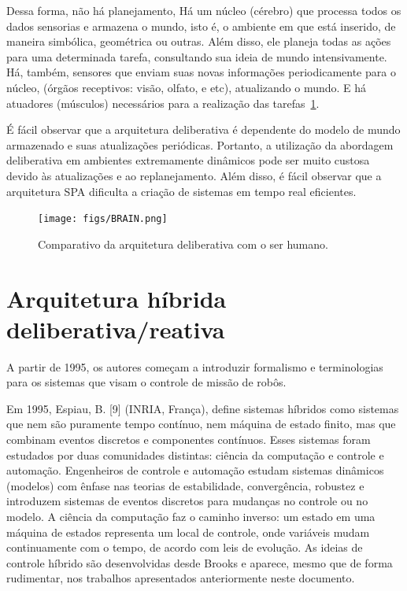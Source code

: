 Dessa forma, não há planejamento,  Há um núcleo (cérebro) que processa todos os
dados sensorias e armazena o mundo, isto é, o ambiente em que está inserido, de maneira simbólica, geométrica ou outras.
Além disso, ele planeja todas as ações para uma determinada tarefa, consultando sua ideia de mundo intensivamente. Há,
também, sensores que enviam suas novas informações periodicamente para o núcleo,
(órgãos receptivos: visão, olfato, e etc), atualizando o mundo. E há
atuadores (músculos) necessários para a realização das tarefas~\ref{brain}.

É fácil observar que a arquitetura deliberativa é dependente do
modelo de mundo armazenado e suas atualizações periódicas. Portanto, a
utilização da abordagem deliberativa em ambientes extremamente dinâmicos pode ser muito
custosa devido às atualizações e ao replanejamento. Além disso, é fácil observar
que a arquitetura SPA dificulta a criação de sistemas em tempo real eficientes.

\begin{figure}[H]
\centering
\texttt{[image: figs/BRAIN.png]}
\caption{Comparativo da arquitetura deliberativa com o ser humano.}
\label{brain}
\end{figure}


\section{Arquitetura híbrida deliberativa/reativa}



A partir de 1995, os autores começam a introduzir formalismo e terminologias
para os sistemas que visam o controle de missão de robôs. 

Em 1995, Espiau, B. [9] (INRIA, França), define sistemas híbridos como sistemas
que nem são puramente tempo contínuo, nem máquina de estado finito, mas que
combinam eventos discretos e componentes contínuos. Esses sistemas foram
estudados por duas comunidades distintas: ciência da computação e controle e
automação. Engenheiros de controle e automação estudam sistemas dinâmicos
(modelos) com ênfase nas teorias de estabilidade, convergência, robustez e
introduzem sistemas de eventos discretos para mudanças no controle ou no modelo.
A ciência da computação faz o caminho inverso: um estado em uma máquina de
estados representa um local de controle, onde variáveis mudam continuamente com
o tempo, de acordo com leis de evolução. As ideias de controle híbrido são
desenvolvidas desde Brooks e aparece, mesmo que de forma rudimentar, nos
trabalhos apresentados anteriormente neste documento. 

